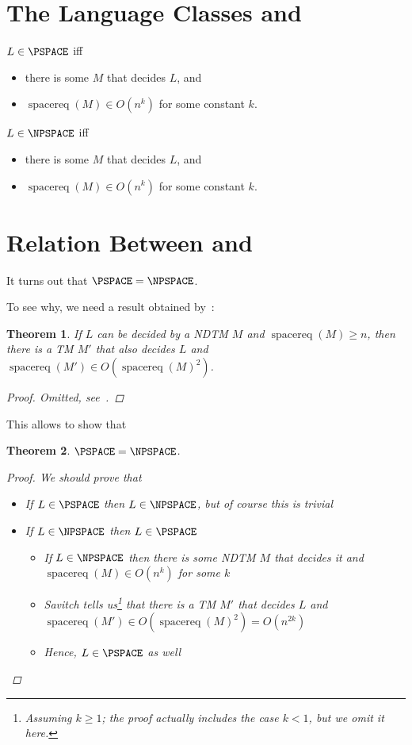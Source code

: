 \documentclass[a4paper]{report}
\newtheorem{theo}{Theorem}
\newcommand{\bookref}[3]{\marginpar{\faBook{}~#1\\Chapter #2\\Section #3}}
\theoremstyle{definition}
\DeclareMathOperator*{\sreq}{spacereq}
\begin{document}
\section{The Language Classes \PSPACE{} and \NPSPACE}
\bookref{ER}{29}{29.2}
$L \in \PSPACE$ iff
\begin{itemize}
\item there is some  $M$ that decides $L$, and
\item $\sreq(M) \in O(n^k)$ for some constant $k$.
\end{itemize}

$L \in \NPSPACE$ iff
\begin{itemize}
\item there is some  $M$ that decides $L$, and
\item $\sreq(M) \in O(n^k)$ for some constant $k$.
\end{itemize}

\section{Relation Between \PSPACE{} and \NPSPACE}
\bookref{ER}{29}{29.2}
It turns out that $\PSPACE = \NPSPACE$.

To see why, we need a result obtained by~\citet{savitch1970relationships}:
\begin{theo}
If $L$ can be decided by a NDTM $M$ and $\sreq(M) \geq n$, then there is a TM $M'$ that also decides $L$ and $\sreq(M') \in O(\sreq(M)^2)$.
\begin{proof}
Omitted, see~\citep{rich2008automata}.
\end{proof}
\end{theo}

This allows to show that
\begin{theo}
$\PSPACE = \NPSPACE$.
\begin{proof}
We should prove that
\begin{itemize}
\item If $L \in \PSPACE$ then $L \in \NPSPACE$, but of course this is trivial
\item If $L \in \NPSPACE$ then $L \in \PSPACE$
\begin{itemize}
\item If $L \in \NPSPACE$ then there is some NDTM $M$ that decides it and $\sreq(M) \in O(n^k)$ for some $k$
\item Savitch tells us\footnote{Assuming $k \geq 1$; the proof actually includes the case $k < 1$, but we omit it here.} that there is a TM $M'$ that decides $L$ and $\sreq(M') \in O(\sreq(M)^2) = O(n^{2k})$
\item Hence, $L \in \PSPACE$ as well
\end{itemize}
\end{itemize}
\end{proof}
\end{theo}
\end{document}

